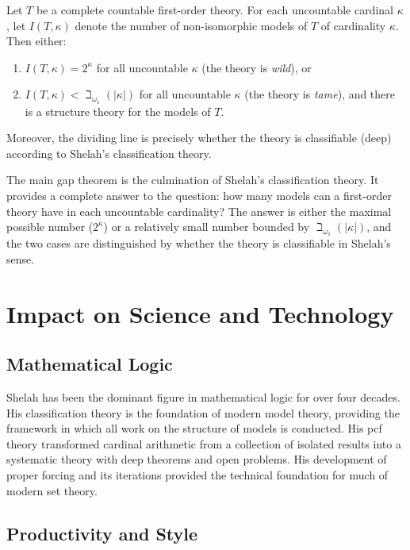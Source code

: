 \begin{theorem}
Let \(T\) be a complete countable first-order theory. For each uncountable cardinal \(\kappa\), let \(I(T,\kappa)\) denote the number of non-isomorphic models of \(T\) of cardinality \(\kappa\). Then either:
\begin{enumerate}
    \item \(I(T,\kappa) = 2^{\kappa}\) for all uncountable \(\kappa\) (the theory is \emph{wild}), or
    \item \(I(T,\kappa) < \beth_{\omega_1}(|\kappa|)\) for all uncountable \(\kappa\) (the theory is \emph{tame}), and there is a structure theory for the models of \(T\).
\end{enumerate}
Moreover, the dividing line is precisely whether the theory is classifiable (deep) according to Shelah's classification theory.
\end{theorem}

The main gap theorem is the culmination of Shelah's classification theory. It provides a complete answer to the question: how many models can a first-order theory have in each uncountable cardinality? The answer is either the maximal possible number (\(2^{\kappa}\)) or a relatively small number bounded by \(\beth_{\omega_1}(|\kappa|)\), and the two cases are distinguished by whether the theory is classifiable in Shelah's sense.

\section{Impact on Science and Technology}

\subsection{Mathematical Logic}

Shelah has been the dominant figure in mathematical logic for over four decades. His classification theory is the foundation of modern model theory, providing the framework in which all work on the structure of models is conducted. His pcf theory transformed cardinal arithmetic from a collection of isolated results into a systematic theory with deep theorems and open problems. His development of proper forcing and its iterations provided the technical foundation for much of modern set theory.

\subsection{Productivity and Style}


